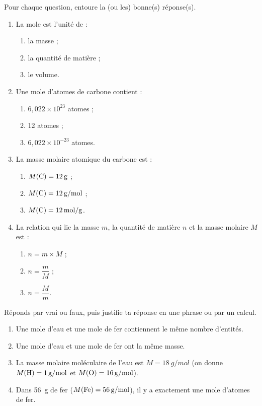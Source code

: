 \documentclass[11pt]{article}
\begin{document}
\begin{exercice}
Pour chaque question, entoure la (ou les) bonne(s) réponse(s).
\begin{enumerate}
\item La mole est l'unité de :
\begin{enumerate}
\item la masse ; \item la quantité de matière ; \item le volume.
\end{enumerate}
\item Une mole d'atomes de carbone contient :
\begin{enumerate}
\item $6,022\times 10^{23}$ atomes ; \item 12 atomes ; \item $6,022\times 10^{-23}$ atomes.
\end{enumerate}
\item La masse molaire atomique du carbone est :
\begin{enumerate}
\item $M(\ce{C}) = \SI{12}{g}$ ; \item $M(\ce{C}) = \SI{12}{g/mol}$ ; \item $M(\ce{C}) = \SI{12}{mol/g}$.
\end{enumerate}
\item La relation qui lie la masse $m$, la quantité de matière $n$ et la masse molaire $M$ est :
\begin{enumerate}
\item $n = m \times M$ ; \item $n = \dfrac{m}{M}$ ; \item $n = \dfrac{M}{m}$.
\end{enumerate}
\end{enumerate}
\end{exercice}

\begin{exercice}
Réponds par vrai ou faux, puis justifie ta réponse en une phrase ou par un calcul.
\begin{enumerate}
\item Une mole d'eau et une mole de fer contiennent le même nombre d'entités.
\item Une mole d'eau et une mole de fer ont la même masse.
\item La masse molaire moléculaire de l'eau  est $M = \SI{18}{g/mol}$ (on donne $M(\ce{H}) = \SI{1}{g/mol}$ et $M(\ce{O}) = \SI{16}{g/mol}$).
\item Dans \SI{56}{g} de fer ($M(\ce{Fe}) = \SI{56}{g/mol}$), il y a exactement une mole d'atomes de fer.
\end{enumerate}
\end{exercice}
\end{document}
